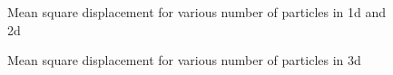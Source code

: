 \documentclass[onecolumn]{article}
\begin{document}
\begin{figure}[H]
\noindent{}
\noindent{}
\caption{Mean square displacement for various number of particles in 1d and 2d}
\label{fig:1d_2d}
\end{figure}

\begin{figure}[H]
\noindent{}
\caption{Mean square displacement for various number of particles in 3d}
\label{fig:3d}
\end{figure}
\end{document}
